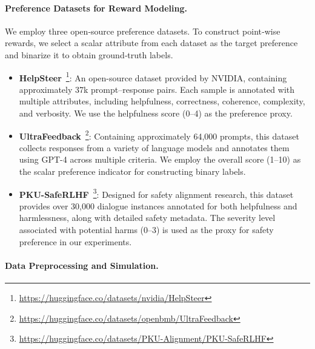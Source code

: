 \documentclass[]{arxiv_singlecolumn}
\theoremstyle{plain}
\theoremstyle{definition}
\theoremstyle{remark}
\begin{document}
\paragraph{Preference Datasets for Reward Modeling.}
We employ three open‑source preference datasets. To construct point‑wise rewards, we select a scalar attribute from each dataset as the target preference and binarize it to obtain ground‑truth labels.

\begin{itemize}[leftmargin=*]
    \item \textbf{HelpSteer}~\citep{Helpsteer}\footnote{\url{https://huggingface.co/datasets/nvidia/HelpSteer}}: An open-source dataset provided by NVIDIA, containing approximately 37k prompt–response pairs. Each sample is annotated with multiple attributes, including helpfulness, correctness, coherence, complexity, and verbosity. We use the helpfulness score (0–4) as the preference proxy.
    
    \item \textbf{UltraFeedback}~\citep{Ultrafeedback}\footnote{\url{https://huggingface.co/datasets/openbmb/UltraFeedback}}: Containing approximately 64,000 prompts, this dataset collects responses from a variety of language models and annotates them using GPT-4 across multiple criteria. We employ the overall score (1–10) as the scalar preference indicator for constructing binary labels.
    
    \item \textbf{PKU-SafeRLHF}~\citep{PKUSafeRLHF}\footnote{\url{https://huggingface.co/datasets/PKU-Alignment/PKU-SafeRLHF}}: Designed for safety alignment research, this dataset provides over 30,000 dialogue instances annotated for both helpfulness and harmlessness, along with detailed safety metadata. The severity level associated with potential harms (0–3) is used as the proxy for safety preference in our experiments.
\end{itemize}

\paragraph{Data Preprocessing and Simulation.}
\end{document}
